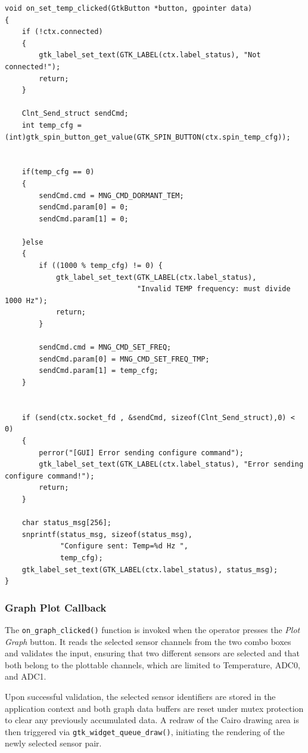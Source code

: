 \begin{verbatim}
void on_set_temp_clicked(GtkButton *button, gpointer data)
{
    if (!ctx.connected)
    {
        gtk_label_set_text(GTK_LABEL(ctx.label_status), "Not connected!");
        return;
    }

    Clnt_Send_struct sendCmd;
    int temp_cfg = (int)gtk_spin_button_get_value(GTK_SPIN_BUTTON(ctx.spin_temp_cfg));


    if(temp_cfg == 0)
    {
    	sendCmd.cmd = MNG_CMD_DORMANT_TEM;
        sendCmd.param[0] = 0;
        sendCmd.param[1] = 0;

    }else
    {
        if ((1000 % temp_cfg) != 0) {
            gtk_label_set_text(GTK_LABEL(ctx.label_status),
                               "Invalid TEMP frequency: must divide 1000 Hz");
            return;
        }

        sendCmd.cmd = MNG_CMD_SET_FREQ;
        sendCmd.param[0] = MNG_CMD_SET_FREQ_TMP;
        sendCmd.param[1] = temp_cfg;
    }


    if (send(ctx.socket_fd , &sendCmd, sizeof(Clnt_Send_struct),0) < 0)
    {
        perror("[GUI] Error sending configure command");
        gtk_label_set_text(GTK_LABEL(ctx.label_status), "Error sending configure command!");
        return;
    }

    char status_msg[256];
    snprintf(status_msg, sizeof(status_msg),
             "Configure sent: Temp=%d Hz ",
			 temp_cfg);
    gtk_label_set_text(GTK_LABEL(ctx.label_status), status_msg);
}
\end{verbatim}


\subsubsection{Graph Plot Callback}

The \texttt{on\_graph\_clicked()} function is invoked when the operator
presses the \textit{Plot Graph} button. It reads the selected sensor
channels from the two combo boxes and validates the input, ensuring that
two different sensors are selected and that both belong to the plottable
channels, which are limited to Temperature, ADC0, and ADC1.

Upon successful validation, the selected sensor identifiers are stored in
the application context and both graph data buffers are reset under mutex
protection to clear any previously accumulated data. A redraw of the
Cairo drawing area is then triggered via \texttt{gtk\_widget\_queue\_draw()},
initiating the rendering of the newly selected sensor pair.


